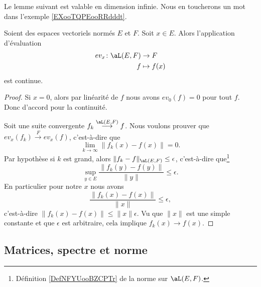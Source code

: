 Le lemme suivant est valable en dimension infinie. Nous en toucherons un mot dans l'exemple \ref{EXooTQPEooRRdddt}.
\begin{lemma}       \label{LEMooWFNXooLyTyyX}
    Soient des espaces vectoriels normés \( E\) et \( F\). Soit \( x\in E\). Alors l'application d'évaluation
    \begin{equation}
        \begin{aligned}
            ev_x\colon \aL(E,F)&\to F \\
            f&\mapsto f(x) 
        \end{aligned}
    \end{equation}
    est continue.
\end{lemma}

\begin{proof}
    Si \( x=0\), alors par linéarité de \( f\) nous avons \( ev_0(f)=0\) pour tout \( f\). Donc d'accord pour la continuité.

    Soit une suite convergente \( f_k\stackrel{\aL(E,F)}{\longrightarrow}f\). Nous voulons prouver que \( ev_x(f_k)\stackrel{F}{\longrightarrow}ev_x(f)\), c'est-à-dire que
    \begin{equation}
        \lim_{k\to \infty} \| f_k(x)-f(x) \|=0.
    \end{equation}
    Par hypothèse si \( k\) est grand, alors \( \| f_k-f  \|_{\aL(E,F)}\leq \epsilon\), c'est-à-dire que\footnote{Définition \ref{DefNFYUooBZCPTr} de la norme sur \( \aL(E,F)\).}
    \begin{equation}
        \sup_{y\in E}\frac{ \| f_k(y)-f(y) \| }{ \| y \| }\leq \epsilon.
    \end{equation}
    En particulier pour notre \( x\) nous avons
    \begin{equation}
        \frac{ \| f_k(x)-f(x) \| }{ \| x \| }\leq \epsilon,
    \end{equation}
    c'est-à-dire \( \| f_k(x)-f(x) \|\leq \| x \|\epsilon\). Vu que \( \| x \|\) est une simple constante et que \( \epsilon\) est arbitraire, cela implique \( f_k(x)\to f(x)\).
\end{proof}

\subsection{Matrices, spectre et norme}

